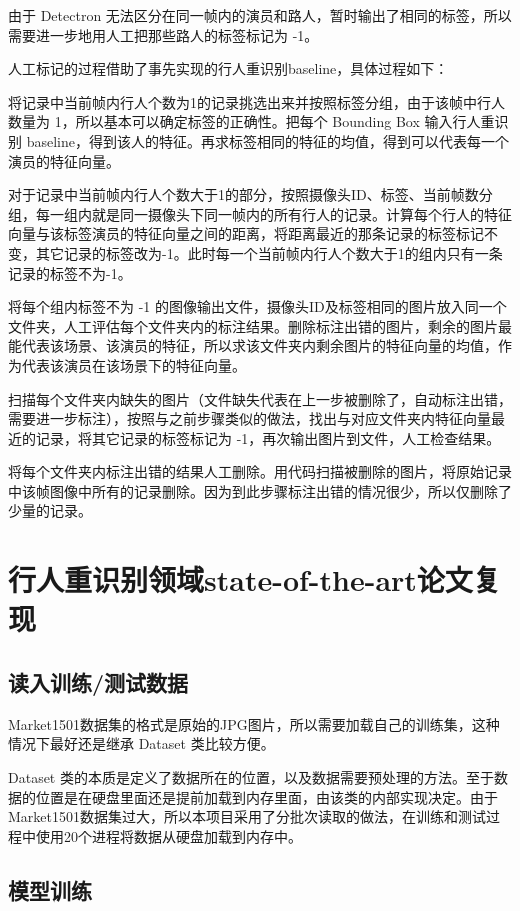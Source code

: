 由于 Detectron 无法区分在同一帧内的演员和路人，暂时输出了相同的标签，所以需要进一步地用人工把那些路人的标签标记为 -1。

人工标记的过程借助了事先实现的行人重识别baseline，具体过程如下：

将记录中当前帧内行人个数为1的记录挑选出来并按照标签分组，由于该帧中行人数量为 1，所以基本可以确定标签的正确性。把每个 Bounding Box 输入行人重识别 baseline，得到该人的特征。再求标签相同的特征的均值，得到可以代表每一个演员的特征向量。

对于记录中当前帧内行人个数大于1的部分，按照摄像头ID、标签、当前帧数分组，每一组内就是同一摄像头下同一帧内的所有行人的记录。计算每个行人的特征向量与该标签演员的特征向量之间的距离，将距离最近的那条记录的标签标记不变，其它记录的标签改为-1。此时每一个当前帧内行人个数大于1的组内只有一条记录的标签不为-1。

将每个组内标签不为 -1 的图像输出文件，摄像头ID及标签相同的图片放入同一个文件夹，人工评估每个文件夹内的标注结果。删除标注出错的图片，剩余的图片最能代表该场景、该演员的特征，所以求该文件夹内剩余图片的特征向量的均值，作为代表该演员在该场景下的特征向量。

扫描每个文件夹内缺失的图片（文件缺失代表在上一步被删除了，自动标注出错，需要进一步标注），按照与之前步骤类似的做法，找出与对应文件夹内特征向量最近的记录，将其它记录的标签标记为 -1，再次输出图片到文件，人工检查结果。

将每个文件夹内标注出错的结果人工删除。用代码扫描被删除的图片，将原始记录中该帧图像中所有的记录删除。因为到此步骤标注出错的情况很少，所以仅删除了少量的记录。

\section{行人重识别领域state-of-the-art论文复现}

\subsection{读入训练/测试数据}
Market1501数据集的格式是原始的JPG图片，所以需要加载自己的训练集，这种情况下最好还是继承 Dataset 类比较方便。

Dataset 类的本质是定义了数据所在的位置，以及数据需要预处理的方法。至于数据的位置是在硬盘里面还是提前加载到内存里面，由该类的内部实现决定。由于Market1501数据集过大，所以本项目采用了分批次读取的做法，在训练和测试过程中使用20个进程将数据从硬盘加载到内存中。

\subsection{模型训练}


